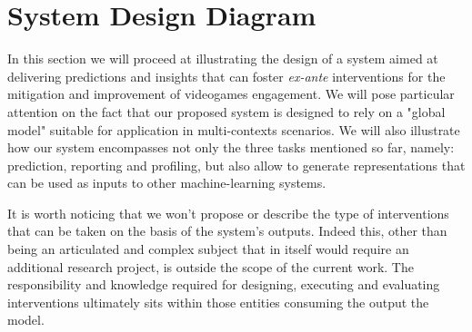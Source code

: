 \section{System Design Diagram}
\label{pipeline}

In this section we will proceed at illustrating the design of a system aimed at delivering predictions and insights that can foster \textit{ex-ante} interventions for the mitigation and improvement of videogames engagement. We will pose particular attention on the fact that our proposed system is designed to rely on a "global model" \cite{wang2019deep} suitable for application in multi-contexts scenarios. We will also illustrate how our system encompasses not only the three tasks mentioned so far, namely: prediction, reporting and profiling, but also allow to generate representations that can be used as inputs to other machine-learning systems. 

It is worth noticing that we won't propose or describe the type of interventions that can be taken on the basis of the system's outputs. Indeed this, other than being an articulated and complex subject that in itself would require an additional research project, is outside the scope of the current work. The responsibility and knowledge required for designing, executing and evaluating interventions ultimately sits within those entities consuming the output the model.

